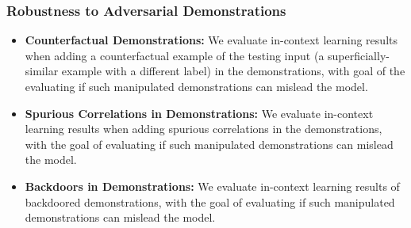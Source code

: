 \subsubsection*{Robustness to Adversarial Demonstrations}
        \begin{itemize}
        \item \textbf{Counterfactual Demonstrations:} We evaluate in-context learning results when adding a counterfactual example of the testing input (a superficially-similar example with a different label) in the demonstrations, with goal of the evaluating if such manipulated demonstrations can mislead the model.
        \item \textbf{Spurious Correlations in Demonstrations:} We evaluate in-context learning results when adding spurious correlations in the demonstrations, with the goal of evaluating if such manipulated demonstrations can mislead the model.
        \item \textbf{Backdoors in Demonstrations:} We evaluate in-context learning results of backdoored demonstrations,  with the goal of evaluating if such manipulated demonstrations can mislead the model.         
    \end{itemize}